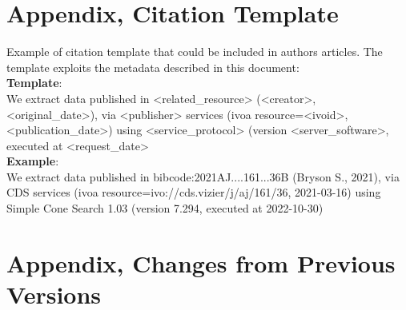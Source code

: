 \documentclass[11pt,a4paper]{ivoa}
\begin{document}



\section{Appendix, Citation Template} \label{sec:appendixC}

Example of citation template that could be included in authors articles. The template exploits the metadata described in this document:\\

\textbf{Template}:\\
We extract data published in <related\_resource> (<creator>, <original\_date>),
via <publisher> services (ivoa resource=<ivoid>, <publication\_date>)
using <service\_protocol> (version <server\_software>, executed at <request\_date>\\


\textbf{Example}:\\
We extract data published in bibcode:2021AJ....161...36B (Bryson S., 2021),
via CDS services (ivoa resource=ivo://cds.vizier/j/aj/161/36, 2021-03-16)
using Simple Cone Search 1.03 (version 7.294, executed at 2022-10-30)


\section{Appendix, Changes from Previous Versions}
\end{document}
